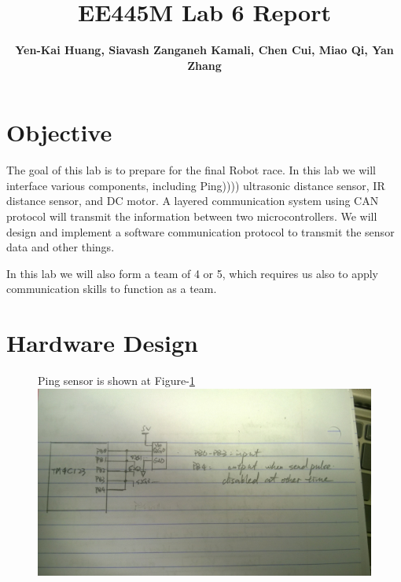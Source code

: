 \documentclass[a4paper]{article}
\newlength{\pic}
\begin{document}
\title{EE445M Lab 6 Report}
\author{\bfseries Yen-Kai Huang, Siavash Zanganeh Kamali, Chen Cui, Miao Qi, Yan Zhang}
\maketitle

\section{Objective} The goal of this lab is to prepare for the final Robot race. In this lab we will interface various
components, including Ping)))) ultrasonic distance sensor, IR distance sensor, and DC motor. A layered communication system
using CAN protocol will transmit the information between two microcontrollers. We will design and implement a software
communication protocol to transmit the sensor data and other things.

In this lab we will also form a team of 4 or 5, which requires us also to apply communication skills to function as a team.

\section{Hardware Design}
\setlength{\pic}{0.8\textwidth}
\begin{figure}[htp]
\noindent Ping sensor is shown at Figure-\ref{ping}
\center
\includegraphics[width=\pic]{circuits/Ping_Circuit}
\caption{ }
\label{ping}
\end{figure}
\end{document}
